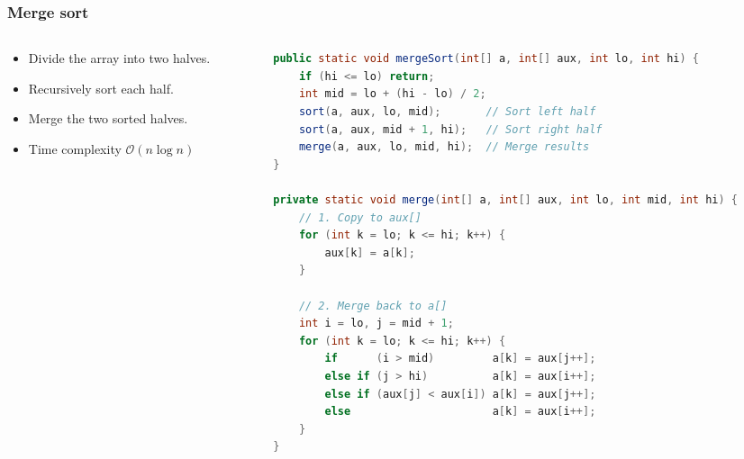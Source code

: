 \documentclass[8pt,aspectratio=169]{beamer}
\begin{document}
\begin{frame}[fragile]
\frametitle{Merge sort}

\begin{columns}[T] %

    \begin{column}{0.4\textwidth}
        \begin{itemize}
            \item Divide the array into two halves.
            \item Recursively sort each half.
            \item Merge the two sorted halves.
            \item Time complexity $\mathcal{O}(n\log n)$
        \end{itemize}
    \end{column}

    \begin{column}{0.58\textwidth}
\begin{lstlisting}[language=Java, basicstyle=\tiny\ttfamily, keywordstyle=\color{blue}, frame=single]
public static void mergeSort(int[] a, int[] aux, int lo, int hi) {
    if (hi <= lo) return;
    int mid = lo + (hi - lo) / 2;
    sort(a, aux, lo, mid);       // Sort left half
    sort(a, aux, mid + 1, hi);   // Sort right half
    merge(a, aux, lo, mid, hi);  // Merge results
}

private static void merge(int[] a, int[] aux, int lo, int mid, int hi) {
    // 1. Copy to aux[]
    for (int k = lo; k <= hi; k++) {
        aux[k] = a[k];
    }

    // 2. Merge back to a[]
    int i = lo, j = mid + 1;
    for (int k = lo; k <= hi; k++) {
        if      (i > mid)         a[k] = aux[j++];
        else if (j > hi)          a[k] = aux[i++];
        else if (aux[j] < aux[i]) a[k] = aux[j++];
        else                      a[k] = aux[i++];
    }
}
\end{lstlisting}
    \end{column}

\end{columns}
\end{frame}
\end{document}
